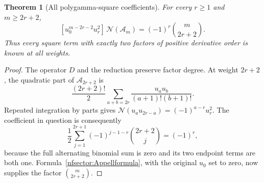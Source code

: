 \documentclass[11pt,a4paper]{article}
\numberwithin{equation}{section}
\newtheorem{theorem}{Theorem}[section]
\theoremstyle{definition}
\theoremstyle{remark}
\begin{document}
\begin{theorem}[All polygamma-square coefficients]\label{nfsector:squares}
For every $r\ge1$ and $m\ge2r+2$,
\begin{equation}\label{nfsector:squarecoef}
 [u_0^{m-2r-2}u_r^2]\,\mathcal N(\mathcal A_m)
       =(-1)^r\binom{m}{2r+2}.
\end{equation}
Thus every square term with exactly two factors of positive derivative
order is known at all weights.
\end{theorem}
\begin{proof}
The operator $D$ and the reduction preserve factor degree.  At weight
$2r+2$, the quadratic part of $\mathcal A_{2r+2}$ is
\[
 \frac{(2r+2)!}{2}
 \sum_{a+b=2r}\frac{u_a u_b}{(a+1)!(b+1)!}.
\]
Repeated integration by parts gives
$\mathcal N(u_a u_{2r-a})=(-1)^{a-r}u_r^2$.
The coefficient in question is consequently
\[
 \frac12\sum_{j=1}^{2r+1}
       (-1)^{j-1-r}\binom{2r+2}{j}=(-1)^r,
\]
because the full alternating binomial sum is zero and its two
endpoint terms are both one.  Formula~\eqref{nfsector:Appellformula},
with the original $u_0$ set to zero, now supplies the factor
$\binom{m}{2r+2}$.
\end{proof}
\end{document}
